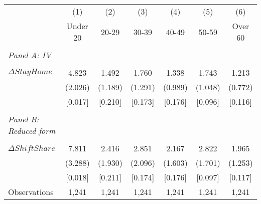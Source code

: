 \begin{tabular}{l*{6}{c}} \toprule
            &\multicolumn{1}{c}{(1)}&\multicolumn{1}{c}{(2)}&\multicolumn{1}{c}{(3)}&\multicolumn{1}{c}{(4)}&\multicolumn{1}{c}{(5)}&\multicolumn{1}{c}{(6)}\\
            &\multicolumn{1}{c}{Under 20}&\multicolumn{1}{c}{20-29}&\multicolumn{1}{c}{30-39}&\multicolumn{1}{c}{40-49}&\multicolumn{1}{c}{50-59}&\multicolumn{1}{c}{Over 60}\\
\hline \\ \multicolumn{1}{l}{\textit{Panel A: IV}} \\\\[-1ex]
$\Delta StayHome$&       4.823&       1.492&       1.760&       1.338&       1.743&       1.213\\
            &     (2.026)&     (1.189)&     (1.291)&     (0.989)&     (1.048)&     (0.772)\\
            &     [0.017]&     [0.210]&     [0.173]&     [0.176]&     [0.096]&     [0.116]\\
\hline \\ \multicolumn{1}{l}{\textit{Panel B: Reduced form}} \\\\[-1ex]
$\Delta ShiftShare$&       7.811&       2.416&       2.851&       2.167&       2.822&       1.965\\
            &     (3.288)&     (1.930)&     (2.096)&     (1.603)&     (1.701)&     (1.253)\\
            &     [0.018]&     [0.211]&     [0.174]&     [0.176]&     [0.097]&     [0.117]\\
\hline
Observations&       1,241&       1,241&       1,241&       1,241&       1,241&       1,241\\
\bottomrule \end{tabular}
